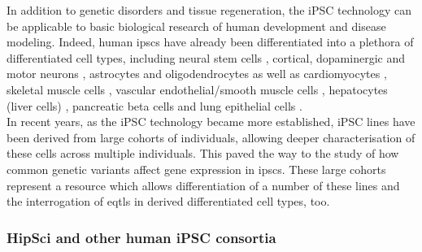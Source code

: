 In addition to genetic disorders and tissue regeneration, the iPSC technology can be applicable to basic biological research of human development and disease modeling.
Indeed, human \glspl{ipsc} have already been differentiated into a plethora of differentiated cell types, including
neural stem cells \cite{d2014large}, 
cortical, dopaminergic 
and motor neurons \cite{shi2012human, kriks2011dopamine, karumbayaram2009directed},
astrocytes \cite{shaltouki2013efficient} and
oligodendrocytes \cite{douvaras2014efficient} 
as well as
cardiomyocytes \cite{burridge2014chemically}, 
skeletal muscle cells \cite{maffioletti2015efficient}, 
vascular endothelial/smooth muscle cells \cite{patsch2015generation}, 
hepatocytes (liver cells) \cite{si2010highly},
pancreatic beta cells \cite{zhang2009highly} and 
lung epithelial cells \cite{huang2014efficient}.\\

In recent years, as the iPSC technology became more established, iPSC lines have been derived from large cohorts of individuals, allowing deeper characterisation of these cells across multiple individuals.
This paved the way to the study of how common genetic variants affect gene expression in \glspl{ipsc}.
These large cohorts represent a resource which allows differentiation of a number of these lines and the interrogation of \glspl{eqtl} in derived differentiated cell types, too.

\subsubsection{HipSci and other human iPSC consortia}

